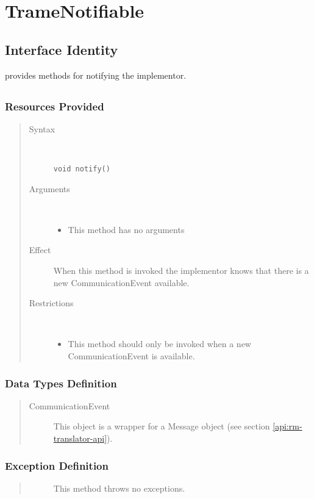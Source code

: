 \section{TrameNotifiable}
\label{api:rm-trame-notifiable}

\subsection{Interface Identity}

\npar {} provides methods for notifying the
implementor.

\subsection{}

\subsubsection{Resources Provided}

\begin{quote}
	\begin{description}
		\item[Syntax] \
		\begin{verbatim}
void notify()
		\end{verbatim}
		\item[Arguments] \
		\begin{itemize}
		  \item This method has no arguments
		\end{itemize}
		\item[Effect] When this method is invoked the implementor knows that there is
		a new CommunicationEvent available.
		\item[Restrictions] \
		\begin{itemize}
		  \item This method should only be invoked when a new CommunicationEvent is
		  available.
		\end{itemize}
	\end{description} 
\end{quote}

\subsubsection{Data Types Definition}

\begin{quote}
	\begin{description}
		\item[CommunicationEvent] This object is a wrapper for a Message object (see
		section \ref{api:rm-translator-api}).
	\end{description} 
\end{quote}

\subsubsection{Exception Definition} 

\begin{quote}
	\begin{description}
		\item[] This method throws no exceptions.
	\end{description} 
\end{quote}